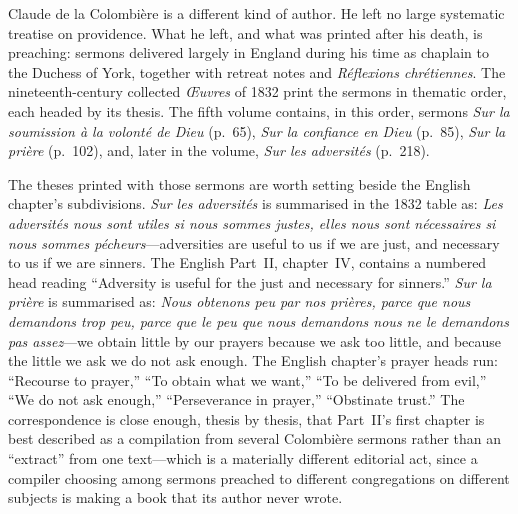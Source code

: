 Claude de la Colombière is a different kind of author. He left no large systematic treatise on providence. What he left, and what was printed after his death, is preaching: sermons delivered largely in England during his time as chaplain to the Duchess of York, together with retreat notes and \emph{Réflexions chrétiennes}. The nineteenth-century collected \emph{Œuvres} of 1832 print the sermons in thematic order, each headed by its thesis. The fifth volume contains, in this order, sermons \emph{Sur la soumission à la volonté de Dieu} (p.~65), \emph{Sur la confiance en Dieu} (p.~85), \emph{Sur la prière} (p.~102), and, later in the volume, \emph{Sur les adversités} (p.~218).

The theses printed with those sermons are worth setting beside the English chapter's subdivisions. \emph{Sur les adversités} is summarised in the 1832 table as: \emph{Les adversités nous sont utiles si nous sommes justes, elles nous sont nécessaires si nous sommes pécheurs}---adversities are useful to us if we are just, and necessary to us if we are sinners. The English Part~II, chapter~IV, contains a numbered head reading ``Adversity is useful for the just and necessary for sinners.'' \emph{Sur la prière} is summarised as: \emph{Nous obtenons peu par nos prières, parce que nous demandons trop peu, parce que le peu que nous demandons nous ne le demandons pas assez}---we obtain little by our prayers because we ask too little, and because the little we ask we do not ask enough. The English chapter's prayer heads run: ``Recourse to prayer,'' ``To obtain what we want,'' ``To be delivered from evil,'' ``We do not ask enough,'' ``Perseverance in prayer,'' ``Obstinate trust.'' The correspondence is close enough, thesis by thesis, that Part~II's first chapter is best described as a compilation from several Colombière sermons rather than an ``extract'' from one text---which is a materially different editorial act, since a compiler choosing among sermons preached to different congregations on different subjects is making a book that its author never wrote.

